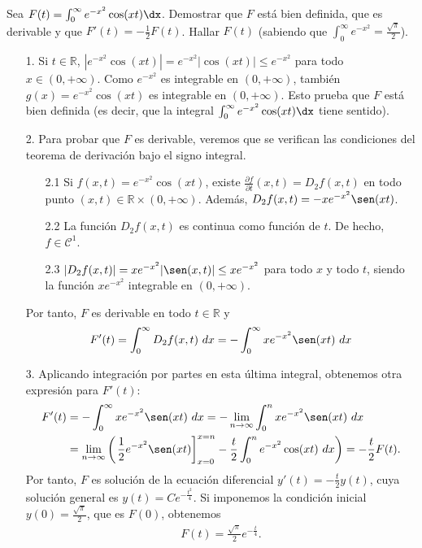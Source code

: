\begin{ejemplo}
Sea $F(t) = \int_{0}^{\infty}{e^{-x^2}\cos(xt) \dx}$. Demostrar que $F$ está bien definida, que es derivable y que $F'(t) = -\frac{1}{2}F(t)$. Hallar $F(t)$ (sabiendo que $\int_{0}^{\infty}{e^{-x^2}} = \frac{\sqrt{\pi}}{2}$).
\begin{enumerate}
    \item[1.] Si $t \in \mathbb{R}$, $|e^{-x^2}\cos(xt)| = e^{-x^2}|\cos(xt)| \leq e^{-x^2}$ para todo $x \in (0, +\infty)$. Como $e^{-x^2}$ es integrable en $(0,+\infty)$, también $g(x) = e^{-x^2}\cos(xt)$ es integrable en $(0,+\infty)$. Esto prueba que $F$ está bien definida (es decir, que la integral $\int_{0}^{\infty}{e^{-x^2}\cos(xt) \dx}$ tiene sentido).
    \item[2.] Para probar que $F$ es derivable, veremos que se verifican las condiciones del teorema de derivación bajo el signo integral.
\begin{enumerate}
    \item[2.1] Si $f(x,t) = e^{-x^2}\cos(xt)$, existe $\frac{\partial f}{\partial t}(x,t) = D_2f(x,t)$ en todo punto $(x,t) \in \mathbb{R} \times (0,+\infty)$. Además, $D_2f(x,t) = -xe^{-x^2}\sen(xt)$.
    \item[2.2] La función $D_2f(x,t)$ es continua como función de $t$. De hecho, $f \in \mathscr{C}^1$.
    \item[2.3] $|D_2f(x,t)| = xe^{-x^2}|\sen(x,t)| \leq xe^{-x^2}$ para todo $x$ y todo $t$, siendo la función $xe^{-x^2}$ integrable en $(0,+\infty)$. 
\end{enumerate}
Por tanto, $F$ es derivable en todo $t \in \mathbb{R}$ y
\begin{align*}
    F'(t) = \int_{0}^{\infty}{D_2f(x,t) \ dx} = -\int_{0}^{\infty}{xe^{-x^2}\sen(xt) \ dx}
\end{align*}
\item[3.] Aplicando integración por partes en esta última integral, obtenemos otra expresión para $F'(t)$:
\begin{align*}
    F'(t) &=  -\int_{0}^{\infty}{xe^{-x^2}\sen(xt) \ dx} = - \lim_{n \to \infty}{\int_{0}^{n}{xe^{-x^2}\sen(xt) \ dx}}\\
    &= \lim_{n \to \infty}{\left( \left. \frac{1}{2}e^{-x^2}\sen(xt)\right]_{x=0}^{x=n} - \frac{t}{2}\int_{0}^{n}{e^{-x^2}\cos(xt) \ dx} \right)} = -\frac{t}{2}F(t).
\end{align*}
Por tanto, $F$ es solución de la ecuación diferencial $y'(t) = -\frac{t}{2}y(t)$, cuya solución general es $y(t) = Ce^{-\frac{t^2}{4}}$. Si imponemos la condición inicial $y(0) = \frac{\sqrt{\pi}}{2}$, que es $F(0)$, obtenemos
\begin{align*}
     F(t) = \frac{\sqrt{\pi}}{2}e^{-\frac{t}{4}}.
\end{align*}
\end{enumerate}
\end{ejemplo}


